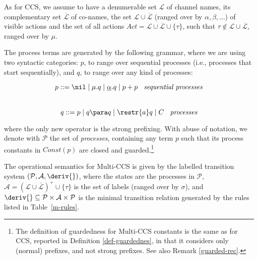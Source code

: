 As for CCS, we assume to have a denumerable set ${\mathcal L}$ of channel names, its complementary 
set  $\overline{\mathcal L}$ of co-names, the set  ${\mathcal L}\cup\overline{\mathcal L}$ (ranged over by $\alpha, \beta, \ldots$)
of visible actions and the set of all actions $Act = {\mathcal L} \cup \overline{\mathcal L} \cup\{\tau\}$,
such that $\tau\not\in{\mathcal L}\cup\overline{\mathcal L}$, ranged over by $\mu$.

The process terms are generated by the following grammar, where we are using two syntactic categories: $p$, 
to range over sequential processes (i.e., processes that start sequentially), 
and $q$, to range over any kind of processes:

\[p ::= \nil \mid \mu.q \mid  \underline{\alpha}.q \mid p+p \; \; \mbox{  {\em sequential processes}}\]\\[-.9cm]
\[q ::= p \mid q\para q \mid \restr{a}q \mid C  \; \; \mbox{  {\em processes}}\]

\noindent
where the only new operator is the strong prefixing.
With abuse of notation, we denote with ${\mathcal P}$ the set of {\em processes}, containing any term $p$
such that its process constants in $Const(p)$ are
closed  and guarded.\footnote{The definition of guardedness for Multi-CCS constants is the same as
for CCS, reported in Definition \ref{def-guardednes}, in that it considers only (normal) prefixes, and not strong prefixes.
See also Remark \ref{guarded-rec}.} 

The  operational semantics for Multi-CCS is given by the labelled 
transition system $({\mathcal P},{\mathcal A}, \deriv{ })$, where the states are the processes
in ${\mathcal P}$, ${\mathcal A} = (\mathcal{L} \cup \overline{\mathcal L})^+ \cup \{\tau\}$
is the set of labels (ranged over by $\sigma$),
and $\deriv{ } \subseteq {\mathcal P} \times{\mathcal A}\times{\mathcal P}$ is the minimal 
transition relation generated by the rules listed in Table~\ref{m-rules}. 


